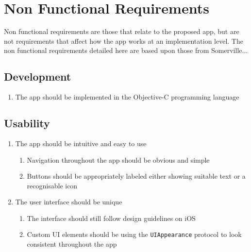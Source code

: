 \documentclass[12pt]{report}
\begin{document}
\section{Non Functional Requirements}

Non functional requirements are those that relate to the proposed app, but are not requirements that affect how the app works at an implementation level. The non functional requirements detailed here are based upon those from Somerville...

\subsection{Development}

\begin{enumerate}[label*=\arabic*.]

\item{The app should be implemented in the Objective-C programming language}

\end{enumerate}

\subsection{Usability}

\begin{enumerate}[label*=\arabic*.]

\item{The app should be intuitive and easy to use}
    \begin{enumerate}[label*=\arabic*.]
        \item{Navigation throughout the app should be obvious and simple}
        \item{Buttons should be appropriately labeled either showing suitable text or a recognisable icon}
    \end{enumerate}

\item{The user interface should be unique}       
    \begin{enumerate}[label*=\arabic*.]
        \item{The interface should still follow design guidelines on iOS}
        \item{Custom UI elements should be using the \texttt{UIAppearance} protocol to look consistent throughout the app}
    \end{enumerate}

\end{enumerate}
\end{document}
